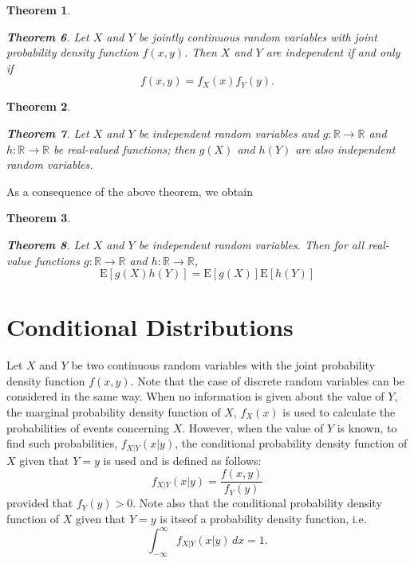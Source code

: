 \documentclass[
]{book}
\newtheorem{theorem}{Theorem}[chapter]
\theoremstyle{definition}
\theoremstyle{definition}
\theoremstyle{definition}
\theoremstyle{definition}
\theoremstyle{remark}
\begin{document}
\begin{theorem}
\protect\hypertarget{thm:unlabeled-div-22}{}\label{thm:unlabeled-div-22}

\textbf{Theorem 6}. \emph{Let \(X\) and \(Y\) be jointly continuous random variables
with joint probability density function \(f (x, y)\). Then \(X\) and \(Y\) are
independent if and only if \[f (x, y) = f_X(x) f_Y (y).\]}

\end{theorem}

\begin{theorem}
\protect\hypertarget{thm:unlabeled-div-23}{}\label{thm:unlabeled-div-23}

\textbf{Theorem 7}. \emph{Let \(X\) and \(Y\) be independent random variables and
\(g : \mathbb{R} \rightarrow\mathbb{R}\) and
\(h : \mathbb{R} \rightarrow\mathbb{R}\) be real-valued functions; then
\(g(X)\) and \(h(Y )\) are also independent random variables.}

\end{theorem}

As a consequence of the above theorem, we obtain

\begin{theorem}
\protect\hypertarget{thm:unlabeled-div-24}{}\label{thm:unlabeled-div-24}

\textbf{Theorem 8}. \emph{Let \(X\) and \(Y\) be independent random variables. Then
for all real-value functions \(g : \mathbb{R} \rightarrow\mathbb{R}\) and
\(h : \mathbb{R} \rightarrow\mathbb{R}\),
\[\mathrm{E}[g(X)h(Y)] = \mathrm{E}[g(X)]\mathrm{E}[h(Y)]\] }

\end{theorem}

\hypertarget{conditional-distributions}{%
\section{Conditional Distributions}\label{conditional-distributions}}

Let \(X\) and \(Y\) be two continuous random variables with the joint
probability density function \(f (x, y)\). Note that the case of discrete
random variables can be considered in the same way. When no information
is given about the value of \(Y\), the marginal probability density
function of \(X\), \(f_X(x)\) is used to calculate the probabilities of
events concerning \(X\). However, when the value of \(Y\) is known, to find
such probabilities, \(f_{X|Y} (x|y)\), the conditional probability density
function of \(X\) given that \(Y = y\) is used and is defined as follows:
\[f_{X|Y} (x|y)  = \frac{f(x,y)}{f_Y(y)}\] provided that \(f_Y (y) > 0\).
Note also that the conditional probability density function of \(X\) given
that \(Y = y\) is itseof a probability density function, i.e.
\[\int_{-\infty}^\infty f_{X|Y}(x|y)\, dx  =  1.\]
\end{document}
